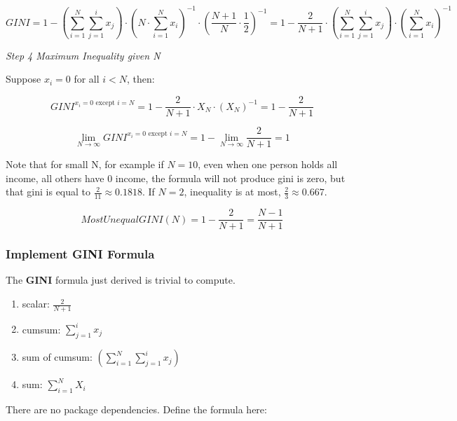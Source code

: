 \documentclass[
]{book}
\providecommand{\tightlist}{%
  \setlength{\itemsep}{0pt}\setlength{\parskip}{0pt}}
\begin{document}
\[
 GINI =
  1 -
  \left(\sum_{i=1}^N \sum_{j=1}^{i} x_j\right)
  \cdot
  \left(
    N \cdot \sum_{i=1}^N x_i
  \right)^{-1}
  \cdot
  \left( \frac{N+1}{N}\cdot\frac{1}{2} \right)^{-1}
  =
  1 - \frac{2}{N+1}
  \cdot
  \left(\sum_{i=1}^N \sum_{j=1}^{i} x_j\right)
  \cdot
  \left(
    \sum_{i=1}^N x_i
  \right)^{-1}
\]

\emph{Step 4 Maximum Inequality given N}

Suppose \(x_i=0\) for all \(i<N\), then:

\[
 GINI^{x_i = 0 \text{ except } i=N}
 =
  1 - \frac{2}{N+1}
  \cdot
  X_N
  \cdot
  \left(
    X_N
  \right)^{-1}
 =
 1 - \frac{2}{N+1}
\]

\[
 \lim_{N \rightarrow \infty} GINI^{x_i = 0 \text{ except } i=N}
 =
 1 -
 \lim_{N \rightarrow \infty}
 \frac{2}{N+1}
 = 1
\]

Note that for small N, for example if \(N=10\), even when one person holds all income, all others have 0 income, the formula will not produce gini is zero, but that gini is equal to \(\frac{2}{11}\approx 0.1818\). If \(N=2\), inequality is at most, \(\frac{2}{3}\approx 0.667\).

\[
 MostUnequalGINI\left(N\right) = 1 - \frac{2}{N+1} = \frac{N-1}{N+1}
\]

\hypertarget{implement-gini-formula}{%
\subsubsection{Implement GINI Formula}\label{implement-gini-formula}}

The \textbf{GINI} formula just derived is trivial to compute.

\begin{enumerate}
\def\labelenumi{\arabic{enumi}.}
\tightlist
\item
  scalar: \(\frac{2}{N+1}\)
\item
  cumsum: \(\sum_{j=1}^{i} x_j\)
\item
  sum of cumsum: \(\left(\sum_{i=1}^N \sum_{j=1}^{i} x_j\right)\)
\item
  sum: \(\sum_{i=1}^N X_i\)
\end{enumerate}

There are no package dependencies. Define the formula here:
\end{document}
